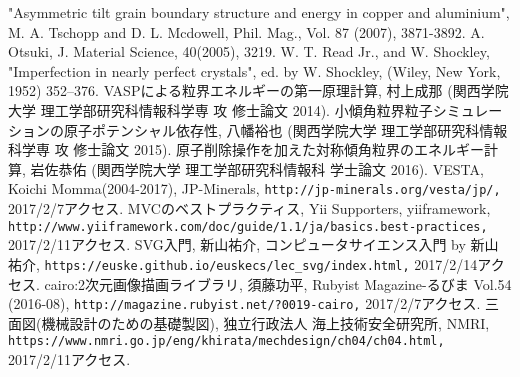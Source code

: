 \begin{thebibliography}{99}
   "Asymmetric tilt grain boundary structure and energy in copper and aluminium", M. A. Tschopp and D. L. Mcdowell, Phil. Mag., Vol. 87 (2007), 3871-3892.
   A. Otsuki, J. Material Science, 40(2005), 3219.
   W. T. Read Jr., and W. Shockley, "Imperfection in nearly perfect crystals", ed. by W. Shockley, (Wiley, New York, 1952) 352--376.
   VASPによる粒界エネルギーの第一原理計算, 村上成那 (関西学院大学 理工学部研究科情報科学専 攻 修士論文 2014).
   小傾角粒界粒子シミュレーションの原子ポテンシャル依存性, 八幡裕也 (関西学院大学 理工学部研究科情報科学専 攻 修士論文 2015).
   原子削除操作を加えた対称傾角粒界のエネルギー計算, 岩佐恭佑 (関西学院大学 理工学部研究科情報科 学士論文 2016).
   VESTA, Koichi Momma(2004-2017), JP-Minerals, \verb|http://jp-minerals.org/vesta/jp/,| 2017/2/7アクセス.
   MVCのベストプラクティス, Yii Supporters, yiiframework, \verb|http://www.yiiframework.com/doc/guide/1.1/ja/basics.best-practices,| 2017/2/11アクセス.
   SVG入門, 新山祐介, コンピュータサイエンス入門 by 新山祐介, \verb|https://euske.github.io/euskecs/lec_svg/index.html,| 2017/2/14アクセス.
   cairo:2次元画像描画ライブラリ, 須藤功平, Rubyist Magazine-るびま Vol.54 (2016-08), \verb|http://magazine.rubyist.net/?0019-cairo,| 2017/2/7アクセス.
   三面図(機械設計のための基礎製図), 独立行政法人 海上技術安全研究所, NMRI, \verb|https://www.nmri.go.jp/eng/khirata/mechdesign/ch04/ch04.html,| 2017/2/11アクセス.
\end{thebibliography}
